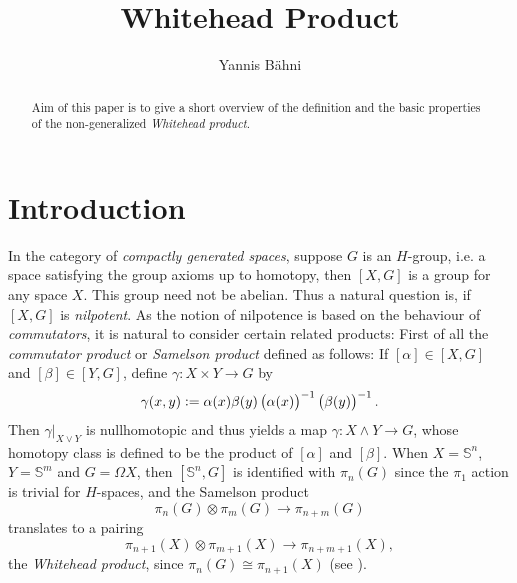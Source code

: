 

\title{Whitehead Product}
\author{Yannis B\"{a}hni}
\address[Yannis B\"{a}hni]{University of Zurich, R\"{a}mistrasse 71, 8006 Zurich}



\begin{abstract}
	Aim of this paper is to give a short overview of the definition and the basic properties of the non-generalized \emph{Whitehead product}.
\end{abstract}

\maketitle

\tableofcontents

\section{Introduction}
In the category of \emph{compactly generated spaces}, suppose $G$ is an $H$-group, i.e. a space satisfying the group axioms up to homotopy, then $[X,G]$ is a group for any space $X$. This group need not be abelian. Thus a natural question is, if $[X,G]$ is \emph{nilpotent}. As the notion of nilpotence is based on the behaviour of \emph{commutators}, it is natural to consider certain related products: First of all the \emph{commutator product} or \emph{Samelson product} defined as follows: If $[\alpha] \in [X,G]$ and $[\beta] \in [Y,G]$, define $\gamma : X \times Y \to G$ by
\begin{equation*}
	\gamma(x,y) := \alpha(x)\beta(y)\del[1]{\alpha(x)}^{-1}\del[1]{\beta(y)}^{-1}.
\end{equation*}
Then $\gamma\vert_{X \vee Y}$ is nullhomotopic and thus yields a map $\gamma : X \wedge Y \to G$, whose homotopy class is defined to be the product of $[\alpha]$ and $[\beta]$. When $X = \mathbb{S}^n$, $Y = \mathbb{S}^m$ and $G = \Omega X$, then $[\mathbb{S}^n,G]$ is identified with $\pi_n(G)$ since the $\pi_1$ action is trivial for $H$-spaces, and the Samelson product
\begin{equation*}
	\pi_n(G) \otimes \pi_m(G) \to \pi_{n + m}(G)
\end{equation*}
\noindent translates to a pairing
\begin{equation*}
	\pi_{n + 1}(X) \otimes \pi_{m + 1}(X) \to \pi_{n + m + 1}(X),
\end{equation*}
\noindent the \emph{Whitehead product}, since $\pi_n(G) \cong \pi_{n + 1}(X)$ (see \cite[456--457]{whitehead:homotopy_theory:1978}).

